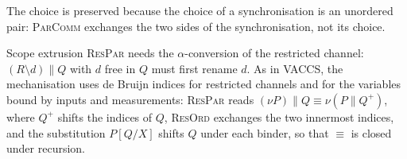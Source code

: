 The choice is preserved because the choice of a synchronisation is an
unordered pair: \textsc{ParComm} exchanges the two sides of the
synchronisation, not its choice.

\begin{remark}\label{rem:debruijn}
Scope extrusion \textsc{ResPar} needs the $\alpha$-conversion of the restricted
channel: $(R \setminus d) \parallel Q$ with $d$ free in $Q$ must first rename
$d$. As in VACCS, the mechanisation uses de Bruijn indices for restricted
channels and for the variables bound by inputs and measurements:
\textsc{ResPar} reads $(\nu P) \parallel Q \equiv \nu (P \parallel Q^{+})$,
where $Q^{+}$ shifts the indices of $Q$, \textsc{ResOrd} exchanges the two
innermost indices, and the substitution $P[Q/X]$ shifts $Q$ under each binder,
so that $\equiv$ is closed under recursion.
\end{remark}
